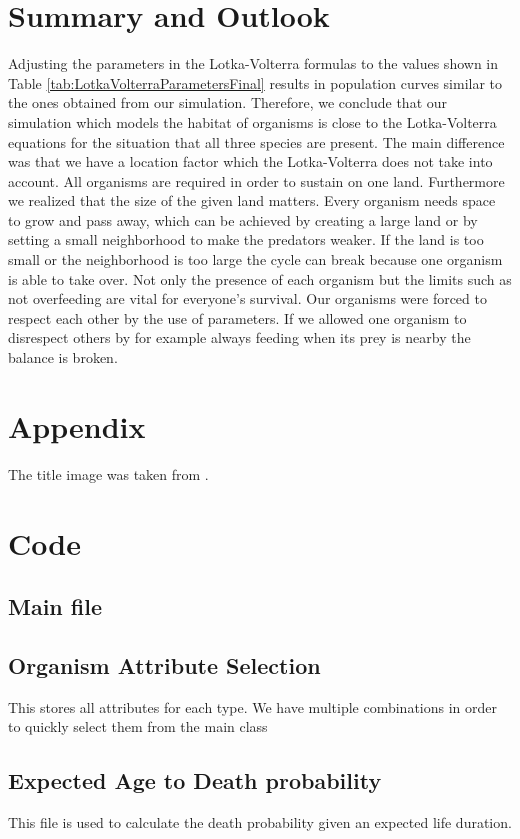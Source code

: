 \documentclass[11pt]{article}
\begin{document}
\section{Summary and Outlook}

Adjusting the parameters in the Lotka-Volterra formulas to the values shown in Table \ref{tab:LotkaVolterraParametersFinal} results in  population curves similar to the ones obtained from our simulation. Therefore, we conclude that our simulation which models the habitat of organisms is close to the Lotka-Volterra equations for the situation that all three species are present. The main difference was that we have a location factor which the Lotka-Volterra does not take into account. All organisms are required in order to sustain on one land. Furthermore we realized that the size of the given land matters. Every organism needs space to grow and pass away, which can be achieved by creating a large land or by setting a small neighborhood to make the predators weaker. If the land is too small or the neighborhood is too large the cycle can break because one organism is able to take over.  Not only the presence of each organism but the limits such as not overfeeding are vital for everyone's survival. Our organisms were forced to respect each other by the use of parameters. If we allowed one organism to disrespect others by for example always feeding when its prey is nearby the balance is broken.
\appendix

\section{Appendix}
The title image was taken from \cite{titleImage}.

\section{Code}
\subsection{Main file}

\subsection{Organism Attribute Selection}
This stores all attributes for each type. We have multiple combinations in order to quickly select them from the main class

\subsection{Expected Age to Death probability}
This file is used to calculate the death probability given an expected life duration.

\end{document}
